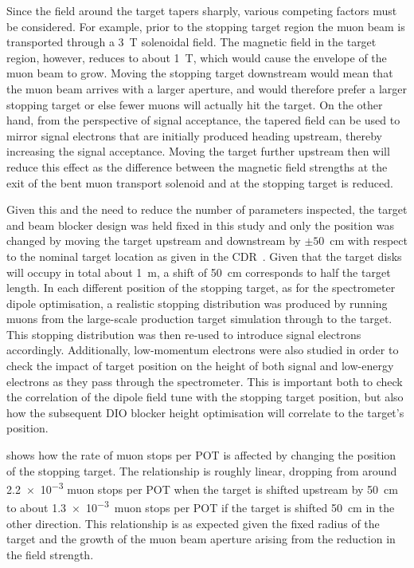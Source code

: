 Since the field around the target tapers sharply, various competing factors must be considered.
For example, prior to the stopping target region the muon beam is transported through a 3~T solenoidal field.
The magnetic field in the target region, however, reduces to about 1~T, which would cause the envelope of the muon beam to grow.
Moving the stopping target downstream would mean that the muon beam arrives with a larger aperture, and would therefore prefer a larger stopping target or else fewer muons will actually hit the target.
On the other hand, from the perspective of signal acceptance, the tapered field can be used to mirror signal electrons that are initially produced heading upstream, thereby increasing the signal acceptance.
Moving the target further upstream then will reduce this effect as the difference between the magnetic field strengths at the exit of the bent muon transport solenoid and at the stopping target is reduced.

Given this and the need to reduce the number of parameters inspected, the target and beam blocker design was held fixed in this study and only the position was changed by moving the target upstream and downstream by $\pm50$~cm with respect to the nominal target location as given in the CDR~\cite{CDRphase2}.
Given that the target disks will occupy in total about 1~m, a shift of 50~cm corresponds to half the target length.
In each different position of the stopping target, as for the spectrometer dipole optimisation, a realistic stopping distribution was produced by running muons from the large-scale production target simulation through to the target.
This stopping distribution was then re-used to introduce signal electrons accordingly.
Additionally, low-momentum electrons were also studied in order to check the impact of target position on the height of both signal and low-energy electrons as they pass through the spectrometer.
This is important both to check the correlation of the dipole field tune with the stopping target position, but also how the subsequent DIO blocker height optimisation will correlate to the target's position.
\FigOptimStopTgtPosMuStops

 shows how the rate of muon stops per \ac{POT} is affected by changing the position of the stopping target.
The relationship is roughly linear, dropping from around \num{2.2e-3} muon stops per POT when the target is shifted upstream by 50~cm to about \num{1.3e-3}~muon stops per POT if the target is shifted 50~cm in the other direction.
This relationship is as expected given the fixed radius of the target and the growth of the muon beam aperture arising from the reduction in the field strength.

